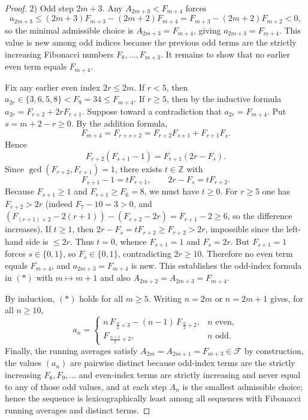 \documentclass[12pt]{article}
\theoremstyle{remark}
\begin{document}
\begin{proof}
2) Odd step $2m+3$. Any $A_{2m+3}<F_{m+4}$ forces
$$a_{2m+3}\le (2m+3)F_{m+3}-(2m+2)F_{m+4}=F_{m+3}-(2m+2)F_{m+2}<0,$$
so the minimal admissible choice is $A_{2m+3}=F_{m+4}$, giving $a_{2m+3}=F_{m+4}$. This value is new among odd indices because the previous odd terms are the strictly increasing Fibonacci numbers $F_8,\dots,F_{m+3}$. It remains to show that no earlier even term equals $F_{m+4}$.

Fix any earlier even index $2r\le 2m$. If $r<5$, then $a_{2r}\in\{3,6,5,8\}<F_9=34\le F_{m+4}$. If $r\ge5$, then by the inductive formula $a_{2r}=F_{r+2}+2rF_{r+1}$. Suppose toward a contradiction that $a_{2r}=F_{m+4}$. Put $s=m+2-r\ge0$. By the addition formula,
$$
F_{m+4}=F_{r+s+2}=F_{r+2}F_{s+1}+F_{r+1}F_s.
$$
Hence
$$
F_{r+2}(F_{s+1}-1)=F_{r+1}(2r-F_s).
$$
Since $\gcd(F_{r+2},F_{r+1})=1$, there exists $t\in\mathbb Z$ with
$$
F_{s+1}-1=tF_{r+1},\qquad 2r-F_s=tF_{r+2}.
$$
Because $F_{s+1}\ge1$ and $F_{r+1}\ge F_6=8$, we must have $t\ge0$. For $r\ge5$ one has $F_{r+2}>2r$ (indeed $F_7-10=3>0$, and $(F_{(r+1)+2}-2(r+1))-(F_{r+2}-2r)=F_{r+1}-2\ge6$, so the difference increases). If $t\ge1$, then $2r-F_s=tF_{r+2}\ge F_{r+2}>2r$, impossible since the left-hand side is $\le 2r$. Thus $t=0$, whence $F_{s+1}=1$ and $F_s=2r$. But $F_{s+1}=1$ forces $s\in\{0,1\}$, so $F_s\in\{0,1\}$, contradicting $2r\ge10$. Therefore no even term equals $F_{m+4}$, and $a_{2m+3}=F_{m+4}$ is new. This establishes the odd-index formula in $(\ast)$ with $m\mapsto m+1$ and also $A_{2m+2}=A_{2m+3}=F_{m+4}$.

By induction, $(\ast)$ holds for all $m\ge5$. Writing $n=2m$ or $n=2m+1$ gives, for all $n\ge10$,
$$
 a_n=
 \begin{cases}
 n\,F_{\,\frac n2+3}-(n-1)\,F_{\,\frac n2+2}, & n\text{ even},\\[4pt]
 F_{\,\frac{n+1}{2}+2}, & n\text{ odd}.
 \end{cases}
$$
Finally, the running averages satisfy $A_{2m}=A_{2m+1}=F_{m+3}\in\mathcal F$ by construction, the values $(a_n)$ are pairwise distinct because odd-index terms are the strictly increasing $F_8,F_9,\dots$ and even-index terms are strictly increasing and never equal to any of those odd values, and at each step $A_n$ is the smallest admissible choice; hence the sequence is lexicographically least among all sequences with Fibonacci running averages and distinct terms. 
\end{proof}
\end{document}
